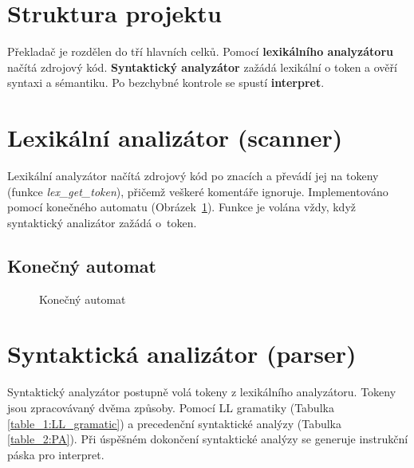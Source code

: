 \documentclass[a4paper, 11pt, titlepage]{article}
\begin{document}
\section{Struktura projektu}
Překladač je rozdělen do tří hlavních celků. Pomocí \textbf{lexikálního analyzátoru} načítá zdrojový kód. \textbf{Syntaktický analyzátor} zažádá lexikální o token a ověří syntaxi a sémantiku. Po bezchybné kontrole se spustí \textbf{interpret}.  

\section{Lexikální analizátor (scanner)}
Lexikální analyzátor načítá zdrojový kód po znacích a převádí jej na tokeny (funkce \textit{lex\_get\_token}), přičemž veškeré komentáře ignoruje. Implementováno pomocí konečného automatu (Obrázek~\ref{picture_1:konecny_automat}). Funkce je volána vždy, když syntaktický analizátor zažádá o~token. 

\subsection{Konečný automat}

\begin{figure}[h]
	\centering
	\caption{Konečný automat}
	\label{picture_1:konecny_automat}
\end{figure}

\section{Syntaktická analizátor (parser)}
Syntaktický analyzátor postupně volá tokeny z lexikálního analyzátoru. Tokeny jsou zpracovávaný dvěma způsoby. Pomocí LL gramatiky (Tabulka \ref{table_1:LL_gramatic}) a precedenční syntaktické analýzy (Tabulka \ref{table_2:PA}). Při úspěšném dokončení syntaktické analýzy se generuje instrukční páska pro interpret.
\end{document}
